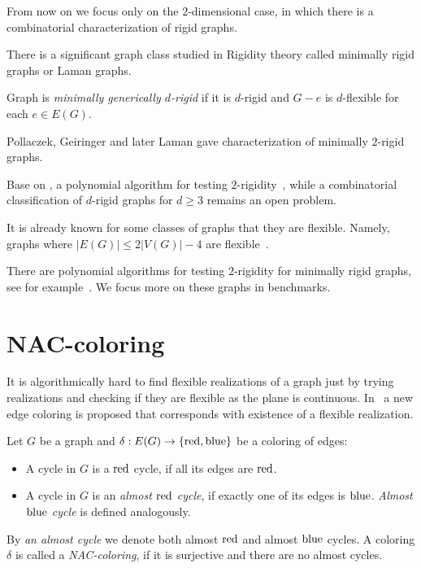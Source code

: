 From now on we focus only on the \( 2 \)-dimensional case,
in which there is a combinatorial characterization of rigid graphs.

There is a significant graph class studied in Rigidity theory
called minimally rigid graphs or Laman graphs.
%
\begin{definition}
	Graph is \emph{minimally generically \( d \)-rigid} if it is \( d \)-rigid
	and \( G - e \) is \(d\)-flexible for each \( e \in E(G) \).
\end{definition}
%
Pollaczek, Geiringer and later Laman gave characterization of minimally $2$-rigid graphs.
%
%
Base on , a polynomial algorithm
for testing $2$-rigidity~\cite{polynomial-min-rigid},
while a combinatorial classification of $d$-rigid graphs for $d\geq 3$ remains an open problem.

It is already known for some classes of graphs that they are flexible.
Namely, graphs where \( |E(G)| \le 2|V(G)| - 4 \)
are flexible~\cite{stable_cuts_2v_4}.

There are polynomial algorithms for testing \( 2 \)-rigidity
for minimally rigid graphs, see for example~\cite{polynomial-min-rigid}.
We focus more on these graphs in benchmarks.

\section{NAC-coloring}

It is algorithmically hard to find flexible realizations of a graph
just by trying realizations and checking if they are flexible
as the plane is continuous.
In~\cite{legersky_original} a new edge coloring is proposed
that corresponds with existence of a flexible realization.

\begin{definition}
	Let \( G \) be a graph and \( \delta: E(G) \to \{ \text{red}, \text{blue} \} \)
	be a coloring of edges:
	\begin{itemize}
		\item A cycle in \( G \) is a \( \text{red} \) cycle, if all its edges are \( \text{red} \).
		\item A cycle in \( G \) is an \emph{almost \( \text{red} \) cycle},
		      if exactly one of its edges is \( \text{blue} \).
		      \emph{Almost \( \text{blue} \) cycle} is defined analogously.
	\end{itemize}
	By \emph{an almost cycle} we denote both almost \( \text{red} \) and almost \( \text{blue} \) cycles.
	A coloring \( \delta \) is called a \emph{NAC-coloring}, if it is surjective
	and there are no almost cycles.
\end{definition}
%

